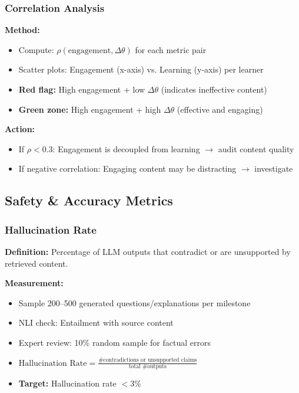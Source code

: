 \documentclass[11pt,letterpaper]{article}
\begin{document}
\subsubsection{Correlation Analysis}

\textbf{Method:}
\begin{itemize}
\item Compute: $\rho(\text{engagement}, \Delta\theta)$ for each metric pair
\item Scatter plots: Engagement (x-axis) vs. Learning (y-axis) per learner
\item \textbf{Red flag:} High engagement + low $\Delta\theta$ (indicates ineffective content)
\item \textbf{Green zone:} High engagement + high $\Delta\theta$ (effective and engaging)
\end{itemize}

\textbf{Action:}
\begin{itemize}
\item If $\rho < 0.3$: Engagement is decoupled from learning $\rightarrow$ audit content quality
\item If negative correlation: Engaging content may be distracting $\rightarrow$ investigate
\end{itemize}

\subsection{Safety \& Accuracy Metrics}

\subsubsection{Hallucination Rate}

\textbf{Definition:} Percentage of LLM outputs that contradict or are unsupported by retrieved content.

\textbf{Measurement:}
\begin{itemize}
\item Sample 200--500 generated questions/explanations per milestone
\item NLI check: Entailment with source content
\item Expert review: 10\% random sample for factual errors
\item $\text{Hallucination Rate} = \frac{\text{\# contradictions or unsupported claims}}{\text{total \# outputs}}$
\item \textbf{Target:} Hallucination rate $< 3\%$
\end{itemize}
\end{document}
